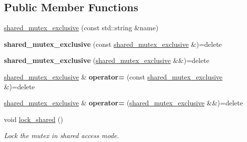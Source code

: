 \subsection*{Public Member Functions}
\begin{DoxyCompactItemize}
\item 
\hyperlink{classcpen333_1_1process_1_1impl_1_1shared__mutex__exclusive_a3acb5fa0c2f3f12200d194d53f7dfad4}{shared\+\_\+mutex\+\_\+exclusive} (const std\+::string \&name)
\item 
\mbox{\label{classcpen333_1_1process_1_1impl_1_1shared__mutex__exclusive_a9c0a76544e5c5540e2a8400414f8c9ff}} 
{\bfseries shared\+\_\+mutex\+\_\+exclusive} (const \hyperlink{classcpen333_1_1process_1_1impl_1_1shared__mutex__exclusive}{shared\+\_\+mutex\+\_\+exclusive} \&)=delete
\item 
\mbox{\label{classcpen333_1_1process_1_1impl_1_1shared__mutex__exclusive_a650b55cd269583bbddecb0c0adadd4d9}} 
{\bfseries shared\+\_\+mutex\+\_\+exclusive} (\hyperlink{classcpen333_1_1process_1_1impl_1_1shared__mutex__exclusive}{shared\+\_\+mutex\+\_\+exclusive} \&\&)=delete
\item 
\mbox{\label{classcpen333_1_1process_1_1impl_1_1shared__mutex__exclusive_a4e7aba2a8c9628b2b960e27f83755911}} 
\hyperlink{classcpen333_1_1process_1_1impl_1_1shared__mutex__exclusive}{shared\+\_\+mutex\+\_\+exclusive} \& {\bfseries operator=} (const \hyperlink{classcpen333_1_1process_1_1impl_1_1shared__mutex__exclusive}{shared\+\_\+mutex\+\_\+exclusive} \&)=delete
\item 
\mbox{\label{classcpen333_1_1process_1_1impl_1_1shared__mutex__exclusive_afd12b41978774613f8615f8740ce80b3}} 
\hyperlink{classcpen333_1_1process_1_1impl_1_1shared__mutex__exclusive}{shared\+\_\+mutex\+\_\+exclusive} \& {\bfseries operator=} (\hyperlink{classcpen333_1_1process_1_1impl_1_1shared__mutex__exclusive}{shared\+\_\+mutex\+\_\+exclusive} \&\&)=delete
\item 
void \hyperlink{classcpen333_1_1process_1_1impl_1_1shared__mutex__exclusive_ae512adfb383e28ca05d0e1e84f79a898}{lock\+\_\+shared} ()
\begin{DoxyCompactList}\small\item\em Lock the mutex in shared access mode. \end{DoxyCompactList}\item 

\end{DoxyCompactItemize}
